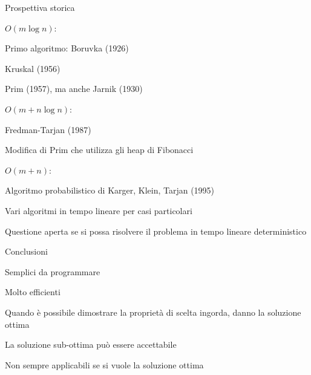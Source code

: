 \begin{frame}{Prospettiva storica}
	
\BIL
\item \alert{$O(m \log n)$}:
	\BI
	\item Primo algoritmo: Boruvka (1926)
	\item Kruskal (1956)
	\item Prim (1957), ma anche Jarnik (1930)
	\EI
\item \alert{$O(m + n \log n)$}:
	\BI
	\item Fredman-Tarjan (1987)
	\item Modifica di Prim che utilizza gli heap di Fibonacci
	\EI
\item \alert{$O(m+n)$}:	
	\BI
	\item Algoritmo probabilistico di Karger, Klein, Tarjan (1995)
	\item Vari algoritmi in tempo lineare per casi particolari
	\item Questione aperta se si possa risolvere il problema in tempo
	  lineare deterministico
	\EI
\EIL

	
\end{frame}



\begin{frame}{Conclusioni}

\vspace{-9pt}
\begin{myboxtitle}[Vantaggi]
\BIL
\item Semplici da programmare
\item Molto efficienti
\item Quando è possibile dimostrare la proprietà di scelta ingorda, danno la soluzione ottima
\item La soluzione sub-ottima può essere accettabile
\EIL
\end{myboxtitle}

\begin{myboxtitle}[Svantaggi]
\BIL
\item Non sempre applicabili se si vuole la soluzione ottima
\EIL
\end{myboxtitle}

\end{frame}






